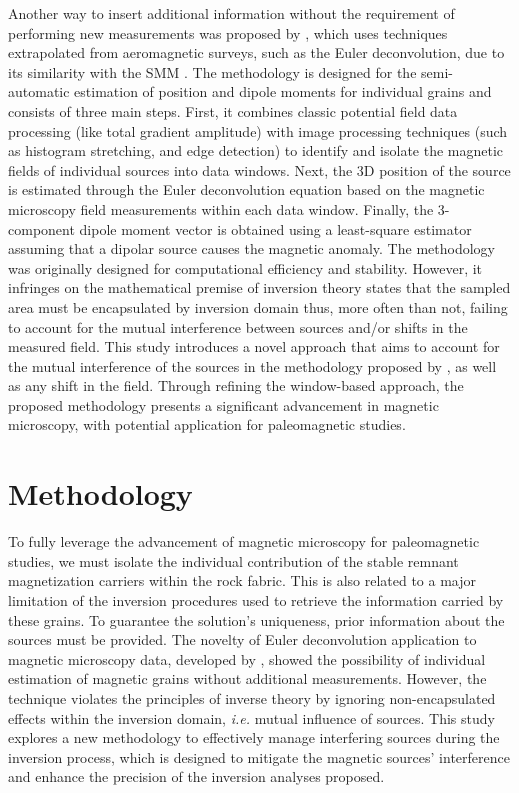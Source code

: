 Another way to insert additional information without the requirement of performing new measurements was proposed by \citet{Souza-Junior2023b}, which uses techniques extrapolated from aeromagnetic surveys, such as the Euler deconvolution, due to its similarity with the SMM \citep{Weiss2007}. The methodology is designed for the semi-automatic estimation of position and dipole moments for individual grains and consists of three main steps. First, it combines classic potential field data processing (like total gradient amplitude) with image processing techniques (such as histogram stretching, and edge detection) to identify and isolate the magnetic fields of individual sources into data windows. Next, the 3D position of the source is estimated through the Euler deconvolution equation based on the magnetic microscopy field measurements within each data window. Finally, the 3-component dipole moment vector is obtained using a least-square estimator assuming that a dipolar source causes the magnetic anomaly. The methodology was originally designed for computational efficiency and stability. However, it infringes on the mathematical premise of inversion theory states that the sampled area must be encapsulated by inversion domain \citep{Baratchart2013, Lima2013} thus, more often than not, failing to account for the mutual interference between sources and/or shifts in the measured field. This study introduces a novel approach that aims to account for the mutual interference of the sources in the methodology proposed by \citet{Souza-Junior2023b}, as well as any shift in the field. Through refining the window-based approach, the proposed methodology presents a significant advancement in magnetic microscopy, with potential application for paleomagnetic studies. 


\section{Methodology}

To fully leverage the advancement of magnetic microscopy for paleomagnetic studies, we must isolate the individual contribution of the stable remnant magnetization carriers within the rock fabric. This is also related to a major limitation of the inversion procedures used to retrieve the information carried by these grains. To guarantee the solution's uniqueness, prior information about the sources must be provided. The novelty of Euler deconvolution application to magnetic microscopy data, developed by \citet{Souza-Junior2024}, showed the possibility of individual estimation of magnetic grains without additional measurements. However, the technique violates the principles of inverse theory by ignoring non-encapsulated effects within the inversion domain, \textit{i.e.} mutual influence of sources. This study explores a new methodology to effectively manage interfering sources during the inversion process, which is designed to mitigate the magnetic sources' interference and enhance the precision of the inversion analyses proposed.


